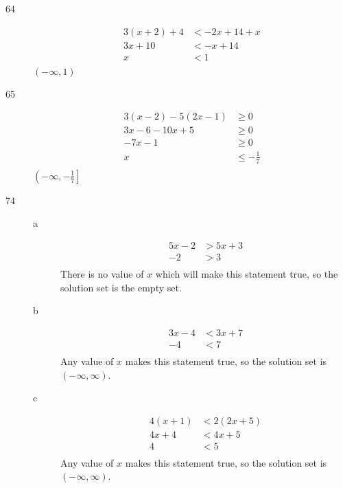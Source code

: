 \documentclass[letterpaper, landscape]{exam}
\begin{document}
\begin{description}
      \item[64]
        \begin{align*}
          3(x + 2) + 4 & < -2x + 14 + x \\
          3x + 10      & < -x + 14 \\
          x            & < 1 \\
        \end{align*}
        $\boxed{ (-\infty, 1) }$

      \item[65]
        \begin{align*}
          3(x - 2) - 5(2x - 1) & \geq 0 \\
          3x - 6 - 10x + 5     & \geq 0 \\
          -7x - 1              & \geq 0 \\
          x                    & \leq - \frac{1}{7} \\
        \end{align*}
        $\boxed{ \left( -\infty, - \frac{1}{7} \right] }$

      \newpage

      \item[74]
        \begin{description}
          \item[a]
            \begin{align*}
              5x - 2 & > 5x + 3 \\
              -2     & > 3 \\
            \end{align*}
            There is no value of $x$ which will make this statement true, so the solution set is the empty set.

          \item[b]
            \begin{align*}
              3x - 4 & < 3x + 7 \\
              -4     & < 7 \\
            \end{align*}
            Any value of $x$ makes this statement true, so the solution set is $\boxed{ (-\infty, \infty) }$.

          \item[c]
            \begin{align*}
              4(x + 1) & < 2(2x + 5) \\
              4x + 4   & < 4x + 5 \\
              4        & < 5 \\
            \end{align*}
            Any value of $x$ makes this statement true, so the solution set is $\boxed{ (-\infty, \infty) }$.


\end{description}
\end{description}
\end{document}
